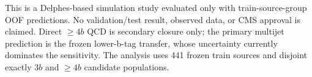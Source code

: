 This is a Delphes-based simulation study evaluated only with train-source-group OOF predictions. No validation/test result, observed data, or CMS approval is claimed. Direct $\geq4b$ QCD is secondary closure only; the primary multijet prediction is the frozen lower-b-tag transfer, whose uncertainty currently dominates the sensitivity. The analysis uses 441 frozen train sources and disjoint exactly $3b$ and $\geq4b$ candidate populations.
